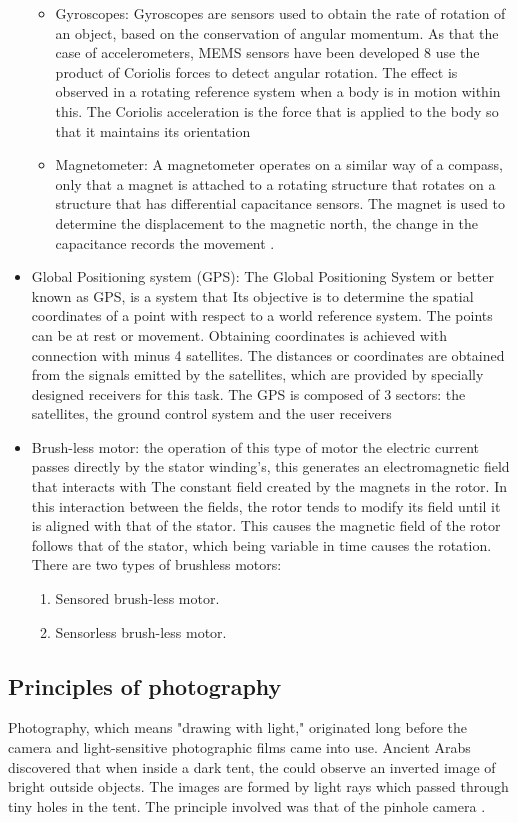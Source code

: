 \begin{itemize}
\begin{itemize}
\item Gyroscopes: Gyroscopes are sensors used to obtain the rate of
rotation of an object, based on the conservation of angular momentum. As
that the case of accelerometers, MEMS sensors have been developed 8 use the product of Coriolis forces to detect angular rotation. The effect is observed in a rotating reference system when a body is in
motion within this. The Coriolis acceleration is the force that is applied to the body so that it maintains its orientation \cite{gyro}
\item Magnetometer: A magnetometer operates on a similar way of a compass,
only that a magnet is attached to a rotating structure that rotates on a structure that has differential capacitance sensors. The magnet is used to
determine the displacement to the magnetic north, the change in the capacitance records the movement .\cite{gyro}
\end{itemize}
\item Global Positioning system (GPS): The Global Positioning System or better known as GPS, is a system that
Its objective is to determine the spatial coordinates of a point with respect to a world reference system. The points can be at rest or movement.
Obtaining coordinates is achieved with connection with minus 4 satellites. The distances or coordinates are obtained from the signals emitted by the satellites, which are provided by specially designed receivers for this task.
The GPS is composed of 3 sectors: the satellites, the ground control system
and the user receivers\cite{GPS}
\item Brush-less motor: the operation of this type of motor the electric current passes directly
by the stator winding's, this generates an electromagnetic field that interacts with
The constant field created by the magnets in the rotor. In this interaction between the fields, the rotor tends to modify its field until it is aligned with that of the stator. This causes
the magnetic field of the rotor follows that of the stator, which being variable in time causes the
rotation.\cite{Perez}
There are two types of brushless motors:\begin{enumerate}
\item Sensored brush-less motor.
\item Sensorless brush-less motor.
\end{enumerate}
\end{itemize}
\subsection{Principles of photography}
Photography, which means "drawing with light," originated long before the camera and light-sensitive photographic films came into use. Ancient Arabs discovered that when inside a dark tent, the could observe an inverted image of bright outside objects. The images are formed by light rays which passed through tiny holes in the tent. The principle involved was that of the pinhole camera  \cite{elements_photogrammetry}.
